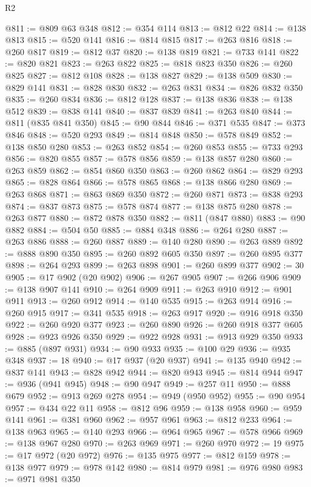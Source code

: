 \begin{lexlean}{R2}
\begin{coremodule}
@811 := @809 @63 @348
@812 := @354 @114
@813 := @812 @22
@814 := @138 @813
@815 := @520 @141
@816 := @814 @815
@817 := @263 @816
@818 := @260 @817
@819 := @812 @37
@820 := @138 @819
@821 := @733 @141
@822 := @820 @821
@823 := @263 @822
@825 := @818 @823 @350
@826 := @260 @825
@827 := @812 @108
@828 := @138 @827
@829 := @138 @509
@830 := @829 @141
@831 := @828 @830
@832 := @263 @831
@834 := @826 @832 @350
@835 := @260 @834
@836 := @812 @128
@837 := @138 @836
@838 := @138 @512
@839 := @838 @141
@840 := @837 @839
@841 := @263 @840
@844 := @811 (@835 @841 @350)
@845 := @90 @844
@846 := @371 @535
@847 := @373 @846
@848 := @520 @293
@849 := @814 @848
@850 := @578 @849
@852 := @138 @850 @280
@853 := @263 @852
@854 := @260 @853
@855 := @733 @293
@856 := @820 @855
@857 := @578 @856
@859 := @138 @857 @280
@860 := @263 @859
@862 := @854 @860 @350
@863 := @260 @862
@864 := @829 @293
@865 := @828 @864
@866 := @578 @865
@868 := @138 @866 @280
@869 := @263 @868
@871 := @863 @869 @350
@872 := @260 @871
@873 := @838 @293
@874 := @837 @873
@875 := @578 @874
@877 := @138 @875 @280
@878 := @263 @877
@880 := @872 @878 @350
@882 := @811 (@847 @880)
@883 := @90 @882
@884 := @504 @50
@885 := @884 @348
@886 := @264 @280
@887 := @263 @886
@888 := @260 @887
@889 := @140 @280
@890 := @263 @889
@892 := @888 @890 @350
@895 := @260 @892 @605 @350
@897 := @260 @895 @377
@898 := @264 @293
@899 := @263 @898
@901 := @260 @899 @377
@902 := 30
@905 := @17 @902 (@20 @902)
@906 := @267 @905
@907 := @266 @906
@909 := @138 @907 @141
@910 := @264 @909
@911 := @263 @910
@912 := @901 @911
@913 := @260 @912
@914 := @140 @535
@915 := @263 @914
@916 := @260 @915
@917 := @341 @535
@918 := @263 @917
@920 := @916 @918 @350
@922 := @260 @920 @377
@923 := @260 @890
@926 := @260 @918 @377 @605
@928 := @923 @926 @350
@929 := @922 @928
@931 := @913 @929 @350
@933 := @885 (@897 @931)
@934 := @90 @933
@935 := @100 @29
@936 := @935 @348
@937 := 18
@940 := @17 @937 (@20 @937)
@941 := @135 @940
@942 := @837 @141
@943 := @828 @942
@944 := @820 @943
@945 := @814 @944
@947 := @936 (@941 @945)
@948 := @90 @947
@949 := @257 @11
@950 := @888 @679
@952 := @913 @269 @278
@954 := @949 (@950 @952)
@955 := @90 @954
@957 := @434 @22 @11
@958 := @812 @96
@959 := @138 @958
@960 := @959 @141
@961 := @381 @960
@962 := @957 @961
@963 := @812 @233
@964 := @138 @963
@965 := @140 @293
@966 := @964 @965
@967 := @578 @966
@969 := @138 @967 @280
@970 := @263 @969
@971 := @260 @970
@972 := 19
@975 := @17 @972 (@20 @972)
@976 := @135 @975
@977 := @812 @159
@978 := @138 @977
@979 := @978 @142
@980 := @814 @979
@981 := @976 @980
@983 := @971 @981 @350

\end{coremodule}
\end{lexlean}
